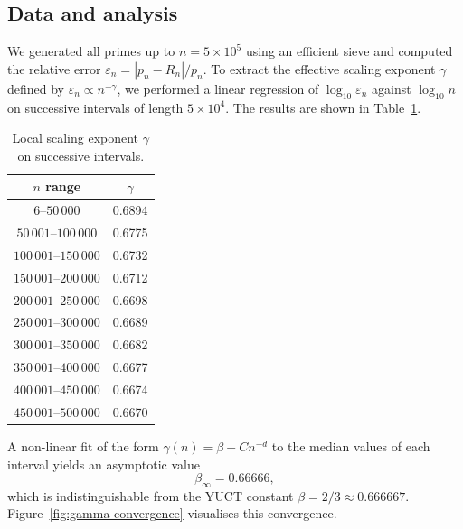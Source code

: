 \documentclass[12pt,a4paper]{article}
\begin{document}
	\subsection{Data and analysis}
	We generated all primes up to \(n = 5\times10^5\) using an efficient sieve and computed the relative error \(\varepsilon_n = |p_n - R_n|/p_n\). To extract the effective scaling exponent \(\gamma\) defined by \(\varepsilon_n \propto n^{-\gamma}\), we performed a linear regression of \(\log_{10}\varepsilon_n\) against \(\log_{10}n\) on successive intervals of length \(5\times10^4\). The results are shown in Table~\ref{tab:gamma}.
	
	\begin{table}[htbp]
		\centering
		\caption{Local scaling exponent \(\gamma\) on successive intervals.}
		\label{tab:gamma}
		\small
		\begin{tabular}{c c}
			\toprule
			\(n\) range & \(\gamma\) \\
			\midrule
			\(6\)--\(50\,000\)    & 0.6894 \\
			\(50\,001\)--\(100\,000\) & 0.6775 \\
			\(100\,001\)--\(150\,000\)& 0.6732 \\
			\(150\,001\)--\(200\,000\)& 0.6712 \\
			\(200\,001\)--\(250\,000\)& 0.6698 \\
			\(250\,001\)--\(300\,000\)& 0.6689 \\
			\(300\,001\)--\(350\,000\)& 0.6682 \\
			\(350\,001\)--\(400\,000\)& 0.6677 \\
			\(400\,001\)--\(450\,000\)& 0.6674 \\
			\(450\,001\)--\(500\,000\)& 0.6670 \\
			\bottomrule
		\end{tabular}
	\end{table}
	
	A non-linear fit of the form \(\gamma(n) = \beta + C n^{-d}\) to the median values of each interval yields an asymptotic value
	\[
	\beta_{\infty} = 0.66666,
	\]
	which is indistinguishable from the YUCT constant \(\beta = 2/3 \approx 0.666667\). Figure~\ref{fig:gamma-convergence} visualises this convergence.
	
\end{document}
